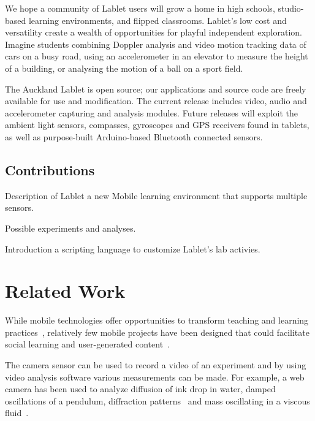 \documentclass{sigchi}
\begin{document}
We hope a community of Lablet users will grow a home in high schools, studio-based learning environments, and flipped classrooms.
Lablet’s low cost and versatility create a wealth of opportunities for playful independent exploration.
Imagine students combining Doppler analysis and video motion tracking data of cars on a busy road, using an accelerometer in an elevator to measure the height of a building, or analysing the motion of a ball on a sport field.

The Auckland Lablet is open source; our applications and source code are freely available for use and modification.
The current release includes video, audio and accelerometer capturing and analysis modules.
Future releases will exploit the ambient light sensors, compasses, gyroscopes and GPS receivers found in tablets, as well as purpose-built Arduino-based Bluetooth connected sensors.


\subsection{Contributions}

\begin{itemize*}
\item Description of Lablet a new Mobile learning environment that supports multiple sensors.
\item Possible experiments and analyses.
\item Introduction a scripting language to customize Lablet's lab activies.
\end{itemize*}


\section{Related Work}
While mobile technologies offer opportunities to transform teaching and learning practices~\cite{karnad2014trends, Kukulska2010}, relatively few mobile projects have been designed that could facilitate social learning and user-generated content~\cite{Frohberg2009}.


\cite{Kearney2012}
\cite{Etkina2006}
\cite{Millar2002}
\cite{Trumper2003}



The camera sensor can be used to record a video of an experiment and by using video analysis software various measurements can be made.
For example, a web camera has been used to analyze diffusion of ink drop in water, damped oscillations of a pendulum, diffraction patterns~\cite{Nedev2006} and mass oscillating in a viscous fluid~\cite{Shamim2010}.
\end{document}
